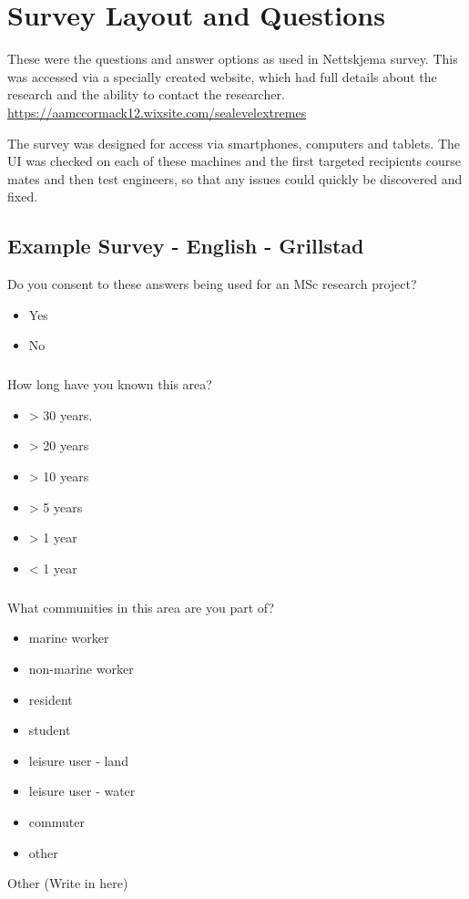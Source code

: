\chapter{Survey Layout and Questions}


These were the questions and answer options as used in Nettskjema survey. This was accessed via a specially created website, which had full details about the research and the ability to contact the researcher. 
\url{https://aamccormack12.wixsite.com/sealevelextremes} 

The survey was designed for access via smartphones, computers and tablets. The UI was checked on each of these machines and the first targeted recipients course mates and then test engineers, so that any issues could quickly be discovered and fixed. 



\section{Example Survey - English - Grillstad}

Do you consent to these answers being used for an MSc research project?
\begin{itemize}
	\item Yes
    \item No
\end{itemize}

\newpage

\paragraph{}
How long have you known this area?
\begin{itemize}
	\item > 30 years.
    \item > 20 years
    \item > 10 years
    \item > 5 years
    \item > 1 year
    \item < 1 year
\end{itemize}

\paragraph{}
What communities in this area are you part of?
\begin{itemize}
    \item marine worker
    \item non-marine worker
    \item resident
    \item student
    \item leisure user - land
    \item leisure user - water
    \item commuter
    \item other 
\end{itemize}
Other (Write in here)
